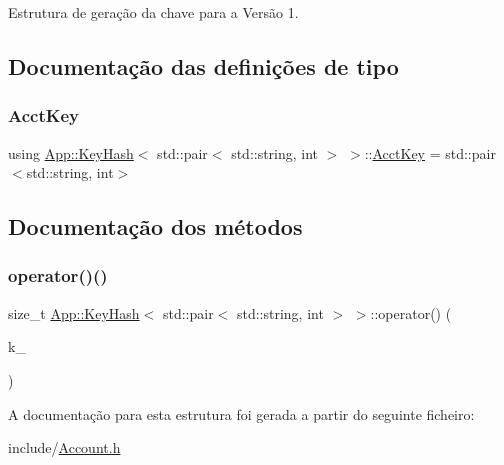 Estrutura de geração da chave para a Versão 1. 

\subsection{Documentação das definições de tipo}
\mbox{\label{structApp_1_1KeyHash_3_01std_1_1pair_3_01std_1_1string_00_01int_01_4_01_4_a454607ff4e38afa850039a3a8f59061e}} 
\subsubsection{\texorpdfstring{Acct\+Key}{AcctKey}}
{\footnotesize\ttfamily using \hyperlink{structApp_1_1KeyHash}{App\+::\+Key\+Hash}$<$ std\+::pair$<$ std\+::string, int $>$ $>$\+::\hyperlink{structApp_1_1KeyHash_3_01std_1_1pair_3_01std_1_1string_00_01int_01_4_01_4_a454607ff4e38afa850039a3a8f59061e}{Acct\+Key} =  std\+::pair$<$std\+::string, int$>$}



\subsection{Documentação dos métodos}
\mbox{\label{structApp_1_1KeyHash_3_01std_1_1pair_3_01std_1_1string_00_01int_01_4_01_4_a54dfa866f4c2942731203f5219142564}} 
\subsubsection{\texorpdfstring{operator()()}{operator()()}}
{\footnotesize\ttfamily size\+\_\+t \hyperlink{structApp_1_1KeyHash}{App\+::\+Key\+Hash}$<$ std\+::pair$<$ std\+::string, int $>$ $>$\+::operator() (\begin{DoxyParamCaption}\item[{const \hyperlink{structApp_1_1KeyHash_3_01std_1_1pair_3_01std_1_1string_00_01int_01_4_01_4_a454607ff4e38afa850039a3a8f59061e}{Acct\+Key} \&}]{k\+\_\+ }\end{DoxyParamCaption})\hspace{0.3cm}{\ttfamily [inline]}}



A documentação para esta estrutura foi gerada a partir do seguinte ficheiro\+:\begin{DoxyCompactItemize}
\item 
include/\hyperlink{Account_8h}{Account.\+h}\end{DoxyCompactItemize}
